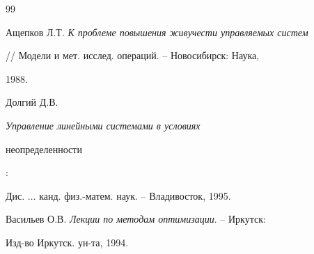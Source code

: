 \begin{thebibliography}{99}







Ащепков Л.Т. {\em К проблеме повышения живучести управляемых систем}


// Модели и мет. исслед. операций. -- Новосибирск: Наука,


1988.




Долгий Д.В. {\em Управление линейными системами в условиях 


неопределенности}:


Дис. $\dotsc$ канд. физ.-матем. наук. -- Владивосток, 1995.




Васильев О.В. {\em Лекции по методам оптимизации}. -- Иркутск:


Изд-во Иркутск. ун-та, 1994.





\end{thebibliography}





\vskip 2cm












\label{end}





